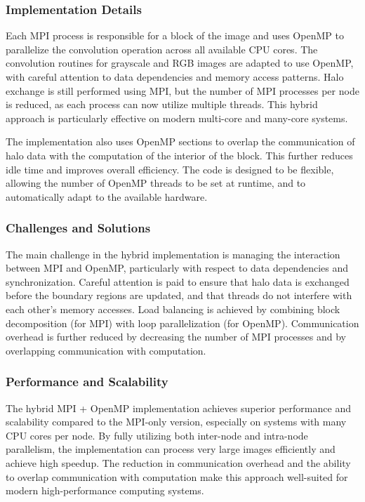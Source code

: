 \documentclass[conference, 10pt]{IEEEtran}
\begin{document}
\subsubsection{Implementation Details}
Each MPI process is responsible for a block of the image and uses OpenMP to parallelize the convolution operation across all available CPU cores. The convolution routines for grayscale and RGB images are adapted to use OpenMP, with careful attention to data dependencies and memory access patterns. Halo exchange is still performed using MPI, but the number of MPI processes per node is reduced, as each process can now utilize multiple threads. This hybrid approach is particularly effective on modern multi-core and many-core systems.

The implementation also uses OpenMP sections to overlap the communication of halo data with the computation of the interior of the block. This further reduces idle time and improves overall efficiency. The code is designed to be flexible, allowing the number of OpenMP threads to be set at runtime, and to automatically adapt to the available hardware.

\subsubsection{Challenges and Solutions}
The main challenge in the hybrid implementation is managing the interaction between MPI and OpenMP, particularly with respect to data dependencies and synchronization. Careful attention is paid to ensure that halo data is exchanged before the boundary regions are updated, and that threads do not interfere with each other's memory accesses. Load balancing is achieved by combining block decomposition (for MPI) with loop parallelization (for OpenMP). Communication overhead is further reduced by decreasing the number of MPI processes and by overlapping communication with computation.

\subsubsection{Performance and Scalability}
The hybrid MPI + OpenMP implementation achieves superior performance and scalability compared to the MPI-only version, especially on systems with many CPU cores per node. By fully utilizing both inter-node and intra-node parallelism, the implementation can process very large images efficiently and achieve high speedup. The reduction in communication overhead and the ability to overlap communication with computation make this approach well-suited for modern high-performance computing systems.
\end{document}
